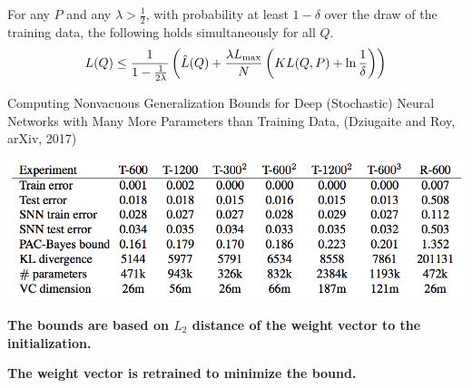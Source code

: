 {{\vfill
For any $P$ and any $\lambda > \frac{1}{2}$, with probability
at least $1-\delta$ over the draw of the training data, the following holds simultaneously for all $Q$.
\vfill
$$L(Q) \leq \frac{1}{1-\frac{1}{2\lambda}}\left(\hat{L}(Q) + \frac{\lambda L_{\max}}{N}\left(KL(Q,P) + \ln \frac{1}{\delta}\right)\right)$$


Computing Nonvacuous Generalization Bounds for Deep (Stochastic) Neural Networks with Many More Parameters than Training Data, (Dziugaite and Roy, arXiv, 2017)

\vfill
\centerline{\includegraphics[width = 8in]{../images/Roy}}

\vfill
{\bf The bounds are based on $L_2$ distance of the weight vector to the initialization.}

\vfill
{\bf The weight vector is retrained to minimize the bound.}
}


}


